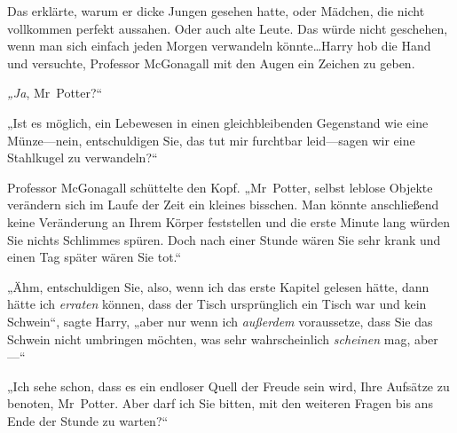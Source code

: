 Das erklärte, warum er dicke Jungen gesehen hatte, oder Mädchen, die nicht vollkommen perfekt aussahen. Oder auch alte Leute. Das würde nicht geschehen, wenn man sich einfach jeden Morgen verwandeln könnte…Harry hob die Hand und versuchte, Professor McGonagall mit den Augen ein Zeichen zu geben.

\emph{„Ja}, Mr~Potter?“

„Ist es möglich, ein Lebewesen in einen gleichbleibenden Gegenstand wie eine Münze—nein, entschuldigen Sie, das tut mir furchtbar leid—sagen wir eine Stahlkugel zu verwandeln?“

Professor McGonagall schüttelte den Kopf. „Mr~Potter, selbst leblose Objekte verändern sich im Laufe der Zeit ein kleines bisschen. Man könnte anschließend keine Veränderung an Ihrem Körper feststellen und die erste Minute lang würden Sie nichts Schlimmes spüren. Doch nach einer Stunde wären Sie sehr krank und einen Tag später wären Sie tot.“

„Ähm, entschuldigen Sie, also, wenn ich das erste Kapitel gelesen hätte, dann hätte ich \emph{erraten} können, dass der Tisch ursprünglich ein Tisch war und kein Schwein“, sagte Harry, „aber nur wenn ich \emph{außerdem} voraussetze, dass Sie das Schwein nicht umbringen möchten, was sehr wahrscheinlich \emph{scheinen} mag, aber—“

„Ich sehe schon, dass es ein endloser Quell der Freude sein wird, Ihre Aufsätze zu benoten, Mr~Potter. Aber darf ich Sie bitten, mit den weiteren Fragen bis ans Ende der Stunde zu warten?“

